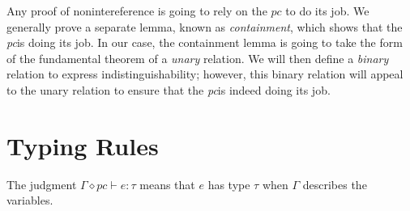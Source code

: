 \documentclass{notes}
\newcommand{\Unit}{\texttt{unit}}
\newcommand{\fun}[2]{\lambda\,#1.\;#2}
\newcommand{\app}[2]{#1\;#2}
\newcommand{\inl}[1]{\textsf{inl}(#1)}
\newcommand{\inr}[1]{\textsf{inr}(#1)}
\newcommand{\case}[5]{\textsf{case}(#1, #2.#3, #4.#5)}
\newcommand{\new}[1]{\textsf{new}(#1)}
\newcommand{\deref}[1]{\ensuremath{\mathord{!}e}}
\newcommand{\assn}[2]{#1 \mathrel{\mathord{:}\!\mathord{=}} #2}
\newcommand{\ptr}[1]{\textsf{ref}\;#1}
\newcommand{\pc}{\textit{pc}}
\begin{document}
Any proof of nonintereference is going to rely on the $\pc$ to do its job.
We generally prove a separate lemma, known as \emph{containment}, which shows that the \pc is doing its job.
In our case, the containment lemma is going to take the form of the fundamental theorem of a \emph{unary} relation.
We will then define a \emph{binary} relation to express indistinguishability; however, this binary relation will appeal to the unary relation to ensure that the \pc is indeed doing its job.

\section{Typing Rules}
\label{sec:typing-rules}

The judgment $\Gamma \diamond \pc \vdash e : \tau$ means that $e$ has type $\tau$ when $\Gamma$ describes the variables.

\end{document}
